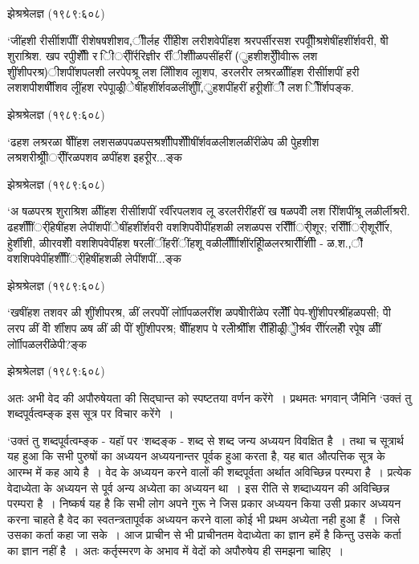 {     झेश्रश्रेलज्ञ (१९८९:६०८) 

‘जींहशी रीर्सीाशपीीं रीशेषषशीशव,ीीर्लह रीींहेीश लरीशवेपींहश श्ररपर्सीरसश रपवीीूंश्रशेषींहशींर्शवरी, षेी शुराश्रिश. खप रपीुशीीें र िीर्ीींर्ररिज्ञीर र्रींीशीीळपसींहरीं (ुहशीशरीुेीवीारू लश शुींशीपरश्र)ीशपींशपलशी लरपेपश्रू लश लोिेीशव लूाशप, डरलरीर लश्ररळाीींहश रीर्सीाशपीं हरी लशशपीशर्षीींशव लूींहश रपेपूाळीूंेषींहशींर्शवळलींशुीीं,ुहशपींहरीं हरीूशींीें लश िीेींर्शपङ्क.	 

झेश्रश्रेलज्ञ (१९८९:६०८) 

‘ढहश लश्ररळा षेीींहश लशसळपपळपसश्रशीीपशीीेषींर्शवळलीशलळींरींळेप ळी पेुहशीश लश्रशरीश्रूीीर्ीींरळपशव ळपींहश इहरीूर...ङ्क

झेश्रश्रेलज्ञ (१९८९:६०८) 

‘अ षळपरश्र शुराश्रिश ळीींहश रीर्सीाशपीं रर्वींरपलशव लू डरलरीरींहरीं ख षळपवीें लश रिींशपींश्रू लळीर्लीश्ररी. ढहशीीींर्ींहेषींहश लेपींशपींेषींहशींर्शवरी वशशिपवीेपींहशळी लशळपस रर्रिीीीर्ीशूर; रर्रिीीीर्ीशूर्रीींंर, हेुर्शींशी, ळीारवशीें वशशिपवेपींहश षरलींींहरींींहशू वळीर्लीीीाशींरहिूीळलरश्रारीींंशीी - ळ.श.,ीें वशशिपवेपींहशीीींर्ींहेषींहशळी लेपींशपीं...ङ्क

झेश्रश्रेलज्ञ (१९८९:६०८) 
 
‘खषींहश तशवर ळी शुींशीपरश्र, ळीं लरपपेीं र्लोाीपळलरींश ळपषेीारींळेप रर्लेीीं पेप-शुींशीपरश्रींहळपसी; पेी लरप ळीं वेीे र्शींशप ळष ळीं ळी पेीं शुींशीपरश्र; षेीींहशप पे रलीेर्श्रीींश र्रीींहेीळीूंुेीर्श्रव रीींंरलहीें रपूेष ळीीं र्लोाीपळलरींळेपी?ङ्क

झेश्रश्रेलज्ञ (१९८९:६०८) 


अतः अभी वेद की अपौरुषेयता की सिद्घान्त को स्पष्टतया वर्णन करेंगे~। प्रथमतः भगवान् जैमिनि ‘उक्तं तु शब्दपूर्वत्वम्ङ्क इस सूत्र पर विचार करेंगे~।

‘उक्तं तु शब्दपूर्वत्वम्ङ्क - यहॉ पर ‘शब्दङ्क - शब्द से शब्द जन्य अध्ययन विवक्षित है~। तथा च सूत्रार्थ यह हुआ कि सभी पुरुषों का अध्ययन अध्ययनान्तर पूर्वक हुआ करता है, यह बात औत्पत्तिक सूत्र के आरम्भ में कह आये है~। वेद के अध्ययन करने वालों की शब्दपूर्वता अर्थात अविच्छिन्न परम्परा है~। प्रत्येक वेदाध्येता के अध्ययन से पूर्व अन्य अध्येता का अध्ययन था~। इस रीति से शब्दाध्ययन की अविच्छिन्न परम्परा है~। निष्कर्ष यह है कि सभी लोग अपने गुरू ने जिस प्रकार अध्ययन किया उसी प्रकार अध्ययन करना चाहते है वेद का स्वतन्त्रतापूर्वक अध्ययन करने वाला कोई भी प्रथम अध्येता नही हुआ हैं~। जिसे उसका कर्ता कहा जा सके~। आज प्राचीन से भी प्राचीनतम वेदाध्येता का ज्ञान हमें है किन्तु उसके कर्ता का ज्ञान नहीं है~। अतः कर्तृस्मरण के अभाव में वेदों को अपौरुषेय ही समझना चाहिए~।

}
